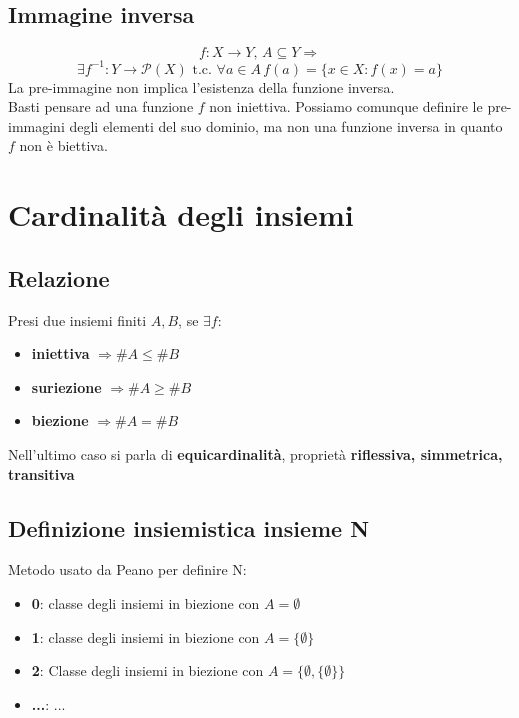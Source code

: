 \documentclass{report}
\begin{document}
    \subsection{Immagine inversa}
        $$f: X \longrightarrow Y, \, A \subseteq Y \Longrightarrow$$
        $$\exists f^{-1}: Y \longrightarrow \mathcal{P}\left(X\right) \textrm{ t.c. } \forall a \in A \, f\left(a\right) = \{x \in X: f\left(x\right) = a\}$$
        La pre-immagine non implica l'esistenza della funzione inversa. \\
        Basti pensare ad una funzione $f$ non iniettiva. Possiamo comunque definire le pre-immagini degli elementi del suo dominio,
        ma non una funzione inversa in quanto $f$ non è biettiva.    
\newpage 
\section{Cardinalità degli insiemi}
    \subsection{Relazione}
        Presi due insiemi finiti $A, B$, se $\exists f$:
        \begin{itemize}
            \item \textbf{iniettiva} $\Longrightarrow \#A \leq \#B$
            \item \textbf{suriezione} $\Longrightarrow \#A \geq \#B$
            \item \textbf{biezione} $\Longrightarrow \#A = \#B$
        \end{itemize}
        Nell'ultimo caso si parla di \textbf{equicardinalità}, proprietà
        \textbf{riflessiva, simmetrica, transitiva}
    \subsection{Definizione insiemistica insieme N}
        Metodo usato da Peano per definire N:
        \begin{itemize}
            \item \textbf{0}: classe degli insiemi in biezione con $A = \emptyset$
            \item \textbf{1}: classe degli insiemi in biezione con $A = \{\emptyset\}$
            \item \textbf{2}: Classe degli insiemi in biezione con $A = \{\emptyset, \{\emptyset\}\}$
            \item \textbf{...}: ...
        \end{itemize}
\end{document}
